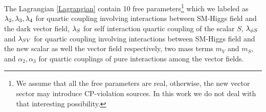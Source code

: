 
The Lagrangian \ref{Lagrangian} contain 10 free parameters\footnote{We assume that all the free parameters are real, otherwise, the new vector sector may introduce CP-violation sources. In this work we do not deal with that interesting possibility.} which we labeled as $\ld[2], \ld[3], \ld[4]$ for quartic coupling involving interactions between SM-Higgs field and the dark vector field, $\ld[S]$ for self interaction quartic coupling of the scalar $S$, $\ld[\phi S]$ and $\ld[SV]$ for quartic coupling involving interactions between SM-Higgs field and the new scalar as well the vector field respectively, two mass terms $m_V$ and $m_S$, and $\alpha_2, \alpha_3$ for quartic couplings of pure interactions among the vector fields. 

